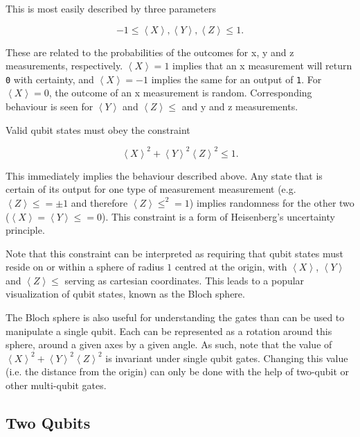 \documentclass[conference]{IEEEtran}
\begin{document}
This is most easily described by three parameters

$$-1 \leq \left\langle X\right\rangle, \left\langle Y\right\rangle, \left\langle Z\right\rangle \leq 1.$$

These are related to the probabilities of the outcomes for x, y and z measurements, respectively. $\left\langle X\right\rangle=1$ implies that an x measurement will return \texttt{0} with certainty, and $\left\langle X\right\rangle=-1$ implies the same for an output of \texttt{1}. For $\left\langle X\right\rangle=0$, the outcome of an x measurement is random. Corresponding behaviour is seen for  $\left\langle Y\right\rangle$ and  $\left\langle Z\right\rangle \leq$ and y and z measurements.

Valid qubit states must obey the constraint

\begin{equation} \label{heisenberg}
\left\langle X\right\rangle^2 + \left\langle Y\right\rangle^2 \left\langle Z\right\rangle^2 \leq 1.
\end{equation}

This immediately implies the behaviour described above. Any state that is certain of its output for one type of measurement measurement (e.g. $\left\langle Z\right\rangle \leq = \pm 1$ and therefore $\left\langle Z\right\rangle \leq^2=1$) implies randomness for the other two ($\left\langle X\right\rangle = \left\langle Y\right\rangle \leq = 0$). This constraint is a form of Heisenberg's uncertainty principle.

Note that this constraint can be interpreted as requiring that qubit states must reside on or within a sphere of radius $1$ centred at the origin, with $\left\langle X\right\rangle$, $\left\langle Y\right\rangle$ and $\left\langle Z\right\rangle \leq$ serving as cartesian coordinates. This leads to a popular visualization of qubit states, known as the Bloch sphere.


The Bloch sphere is also useful for understanding the gates than can be used to manipulate a single qubit. Each can be represented as a rotation around this sphere, around a given axes by a given angle. As such, note that the value of $\left\langle X\right\rangle^2 + \left\langle Y\right\rangle^2 \left\langle Z\right\rangle^2$ is invariant under single qubit gates. Changing this value (i.e. the distance from the origin) can only be done with the help of two-qubit or other multi-qubit gates.


\subsection{Two Qubits}
\end{document}
